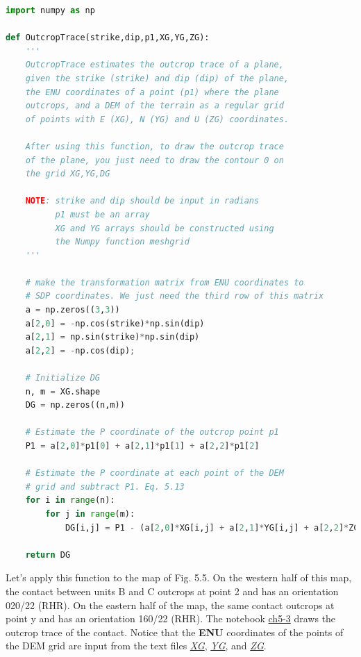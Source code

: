 \documentclass[a4paper , 12pt]{book}
\begin{document}
\begin{lstlisting}[language=Python, frame=single]
import numpy as np

def OutcropTrace(strike,dip,p1,XG,YG,ZG):
    '''
    OutcropTrace estimates the outcrop trace of a plane,
    given the strike (strike) and dip (dip) of the plane,
    the ENU coordinates of a point (p1) where the plane
    outcrops, and a DEM of the terrain as a regular grid
    of points with E (XG), N (YG) and U (ZG) coordinates.
    
    After using this function, to draw the outcrop trace 
    of the plane, you just need to draw the contour 0 on 
    the grid XG,YG,DG
    
    NOTE: strike and dip should be input in radians
          p1 must be an array
          XG and YG arrays should be constructed using 
          the Numpy function meshgrid
    '''
    
    # make the transformation matrix from ENU coordinates to 
    # SDP coordinates. We just need the third row of this matrix
    a = np.zeros((3,3))
    a[2,0] = -np.cos(strike)*np.sin(dip) 
    a[2,1] = np.sin(strike)*np.sin(dip) 
    a[2,2] = -np.cos(dip);
    
    # Initialize DG
    n, m = XG.shape
    DG = np.zeros((n,m))
    
    # Estimate the P coordinate of the outcrop point p1
    P1 = a[2,0]*p1[0] + a[2,1]*p1[1] + a[2,2]*p1[2]
    
    # Estimate the P coordinate at each point of the DEM
    # grid and subtract P1. Eq. 5.13
    for i in range(n):
        for j in range(m):
            DG[i,j] = P1 - (a[2,0]*XG[i,j] + a[2,1]*YG[i,j] + a[2,2]*ZG[i,j])
    
    return DG  
\end{lstlisting}

Let's apply this function to the map of Fig. 5.5. On the western half of this map, the contact between units B and C outcrops at point 2 and has an orientation 020/22 (RHR). On the eastern half of the map, the same contact outcrops at point y and has an orientation 160/22 (RHR). The notebook \href{https://github.com/nfcd/compGeo/blob/master/source/notebooks/ch5-3.ipynb}{ch5-3} draws the outcrop trace of the contact. Notice that the \textbf{ENU} coordinates of the points of the DEM grid are input from the text files \href{https://github.com/nfcd/compGeo/blob/master/source/data/ch5-3/XG.txt}{\textit{XG}}, \href{https://github.com/nfcd/compGeo/blob/master/source/data/ch5-3/YG.txt}{\textit{YG}}, and \href{https://github.com/nfcd/compGeo/blob/master/source/data/ch5-3/ZG.txt}{\textit{ZG}}.
\end{document}
